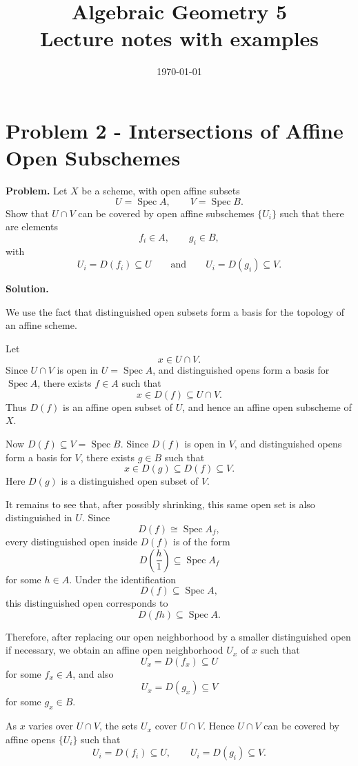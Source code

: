 \documentclass[12pt,a4paper]{article}
\title{\bfseries Algebraic Geometry 5\\


\large Lecture notes with examples}
\author{}
\date{\today}
\DeclareMathOperator{\Spec}{Spec}
\providecommand{\Spec}{\operatorname{Spec}}
\theoremstyle{notespace}
\begin{document}
\maketitle
\tableofcontents
\clearpage

\section{Problem 2 - Intersections of Affine Open Subschemes}

\textbf{Problem.}
Let \(X\) be a scheme, with open affine subsets
\[
U=\Spec A,
\qquad
V=\Spec B.
\]
Show that \(U\cap V\) can be covered by open affine subschemes \(\{U_i\}\) such that there are elements
\[
f_i\in A,
\qquad
g_i\in B,
\]
with
\[
U_i=D(f_i)\subseteq U
\qquad\text{and}\qquad
U_i=D(g_i)\subseteq V.
\]

\textbf{Solution.}

We use the fact that distinguished open subsets form a basis for the topology of an affine scheme.

Let
\[
x\in U\cap V.
\]
Since \(U\cap V\) is open in \(U=\Spec A\), and distinguished opens form a basis for \(\Spec A\), there exists \(f\in A\) such that
\[
x\in D(f)\subseteq U\cap V.
\]
Thus \(D(f)\) is an affine open subset of \(U\), and hence an affine open subscheme of \(X\).

Now \(D(f)\subseteq V=\Spec B\). Since \(D(f)\) is open in \(V\), and distinguished opens form a basis for \(V\), there exists \(g\in B\) such that
\[
x\in D(g)\subseteq D(f)\subseteq V.
\]
Here \(D(g)\) is a distinguished open subset of \(V\).

It remains to see that, after possibly shrinking, this same open set is also distinguished in \(U\). Since
\[
D(f)\cong \Spec A_f,
\]
every distinguished open inside \(D(f)\) is of the form
\[
D\left(\frac{h}{1}\right)\subseteq \Spec A_f
\]
for some \(h\in A\). Under the identification
\[
D(f)\subseteq \Spec A,
\]
this distinguished open corresponds to
\[
D(fh)\subseteq \Spec A.
\]

Therefore, after replacing our open neighborhood by a smaller distinguished open if necessary, we obtain an affine open neighborhood \(U_x\) of \(x\) such that
\[
U_x=D(f_x)\subseteq U
\]
for some \(f_x\in A\), and also
\[
U_x=D(g_x)\subseteq V
\]
for some \(g_x\in B\).

As \(x\) varies over \(U\cap V\), the sets \(U_x\) cover \(U\cap V\). Hence \(U\cap V\) can be covered by affine opens \(\{U_i\}\) such that
\[
U_i=D(f_i)\subseteq U,
\qquad
U_i=D(g_i)\subseteq V.
\]
\end{document}
